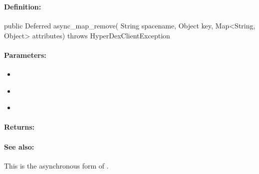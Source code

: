 \pagebreak
\subsubsection{}
\label{api:java:async_map_remove}


\paragraph{Definition:}
\begin{javacode}
public Deferred async_map_remove(
        String spacename,
        Object key,
        Map<String, Object> attributes) throws HyperDexClientException
\end{javacode}

\paragraph{Parameters:}
\begin{itemize}[noitemsep]
\item {}\\

\item {}\\

\item {}\\

\end{itemize}

\paragraph{Returns:}


\paragraph{See also:}  This is the asynchronous form of .

\pagebreak
\subsubsection{}
\label{api:java:cond_map_remove}


